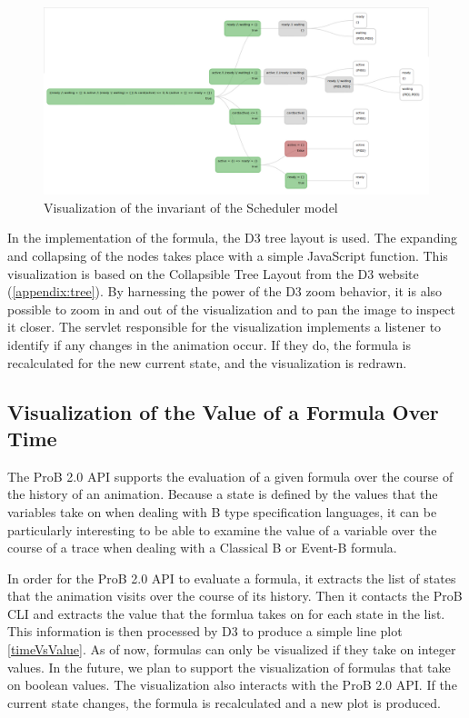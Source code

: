 \begin{figure}[h!]
\centering
\includegraphics[width=15cm]{bilder/invariant.png}
\caption{Visualization of the invariant of the Scheduler model}
\label{predicate}
\end{figure}

In the implementation of the formula, the D3 tree layout is used. The expanding and collapsing of the nodes takes place with a simple JavaScript function. This visualization is based on the Collapsible Tree Layout from the D3 website (\ref{appendix:tree}). By harnessing the power of the D3 zoom behavior, it is also possible to zoom in and out of the visualization and to pan the image to inspect it closer. The servlet responsible for the visualization implements a listener to identify if any changes in the animation occur. If they do, the formula is recalculated for the new current state, and the visualization is redrawn.

\subsection{Visualization of the Value of a Formula Over Time}

The ProB 2.0 API supports the evaluation of a given formula over the course of the history of an animation.
Because a state is defined by the values that the variables take on when dealing with B type specification languages, it can be particularly interesting to be able to examine the value of a variable over the course of a trace when dealing with a Classical B or Event-B formula. 

In order for the ProB 2.0 API to evaluate a formula, it extracts the list of states that the animation visits over the course of its history. Then it contacts the ProB CLI and extracts the value that the formlua takes on for each state in the list. This information is then processed by D3 to produce a simple line plot \ref{timeVsValue}. As of now, formulas can only be visualized if they take on integer values. In the future, we plan to support the visualization of formulas that take on boolean values. The visualization also interacts with the ProB 2.0 API. If the current state changes, the formula is recalculated and a new plot is produced.


